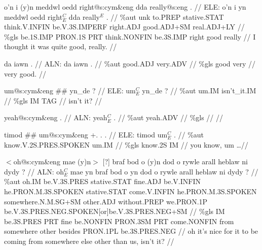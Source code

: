 \documentclass[a4paper,10pt]{article}
\begin{document}
\ex
\begingl[lingstyle=gergl]
\glchat o'n i (y)n meddwl oedd right@s:cym\&eng dda really@s:eng . //
\glsurface ELE:  o'n i yn meddwl oedd right$^{C}_{E}$ dda really$^{E}$ .  //
\glauto \%aut  unk to{\scriptsize .PREP} stative{\scriptsize .STAT} think{\scriptsize .V.INFIN} be{\scriptsize .V.3S.IMPERF} right{\scriptsize .ADJ} good{\scriptsize .ADJ+SM} real{\scriptsize .ADJ+LY}   //
\glmanual \%gls  be{\scriptsize .1S.IMP} PRON{\scriptsize .1S} PRT think{\scriptsize .NONFIN} be{\scriptsize .3S.IMP} right good really   //
\gleng I thought it was quite good, really. //
\endgl
\xe

\ex
\begingl[lingstyle=gergl]
\glchat da iawn . //
\glsurface ALN:  da iawn .  //
\glauto \%aut  good{\scriptsize .ADJ} very{\scriptsize .ADV}   //
\glmanual \%gls  good very   //
\gleng very good. //
\endgl
\xe

\ex
\begingl[lingstyle=gergl]
\glchat um@s:cym\&eng \#\# yn\_de ? //
\glsurface ELE:  um$^{C}_{E}$ yn\_de ?  //
\glauto \%aut  um{\scriptsize .IM} isn't\_it{\scriptsize .IM}   //
\glmanual \%gls  IM TAG   //
\gleng isn't it? //
\endgl
\xe

\ex
\begingl[lingstyle=gergl]
\glchat yeah@s:cym\&eng . //
\glsurface ALN:  yeah$^{C}_{E}$ .  //
\glauto \%aut  yeah{\scriptsize .ADV}   //
\glmanual \%gls     //
\gleng  //
\endgl
\xe

\ex
\begingl[lingstyle=gergl]
\glchat timod \#\# um@s:cym\&eng +. . . //
\glsurface ELE:  timod um$^{C}_{E}$ .  //
\glauto \%aut  know{\scriptsize .V.2S.PRES.SPOKEN} um{\scriptsize .IM}   //
\glmanual \%gls  know{\scriptsize .2S} IM   //
\gleng you know, um \dots  //
\endgl
\xe

\ex
\begingl[lingstyle=gergl]
\glchat $<$oh@s:cym\&eng mae (y)n$>$ [?] braf bod o (y)n dod o rywle arall heblaw ni dydy ? //
\glsurface ALN:  oh$^{C}_{E}$ mae yn braf bod o yn dod o rywle arall heblaw ni dydy ?  //
\glauto \%aut  oh{\scriptsize .IM} be{\scriptsize .V.3S.PRES} stative{\scriptsize .STAT} fine{\scriptsize .ADJ} be{\scriptsize .V.INFIN} he{\scriptsize .PRON.M.3S.SPOKEN} stative{\scriptsize .STAT} come{\scriptsize .V.INFIN} he{\scriptsize .PRON.M.3S.SPOKEN} somewhere{\scriptsize .N.M.SG+SM} other{\scriptsize .ADJ} without{\scriptsize .PREP} we{\scriptsize .PRON.1P} be{\scriptsize .V.3S.PRES.NEG.SPOKEN[or]be.V.3S.PRES.NEG+SM}   //
\glmanual \%gls  IM be{\scriptsize .3S.PRES} PRT fine be{\scriptsize .NONFIN} PRON{\scriptsize .3SM} PRT come{\scriptsize .NONFIN} from somewhere other besides PRON{\scriptsize .1PL} be{\scriptsize .3S.PRES.NEG}   //
\gleng oh it's nice for it to be coming from somewhere else other than us, isn't it? //
\endgl
\xe
\end{document}
